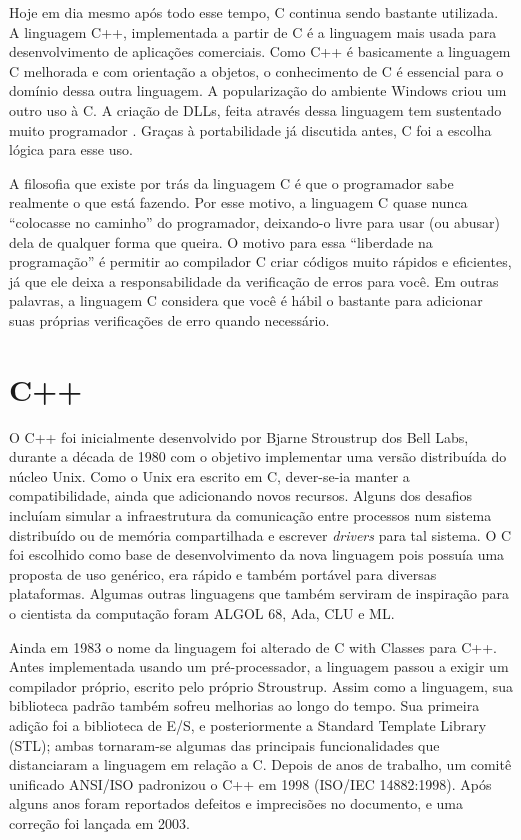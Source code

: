 \documentclass[
    12pt,               %
    openright,          %
    twoside,            %
    a4paper,            %
    brazil              %
    ]{abntex2}
\begin{document}
Hoje em dia mesmo após todo esse tempo, C continua sendo bastante utilizada. A
linguagem C++, implementada a partir de C é a linguagem mais usada para
desenvolvimento de aplicações comerciais.  Como C++ é basicamente a linguagem C
melhorada e com orientação a objetos, o conhecimento de C é essencial para o
domínio dessa outra linguagem. A popularização do ambiente Windows criou um
outro uso à C. A criação de DLLs, feita através dessa linguagem tem sustentado
muito programador . Graças à portabilidade já discutida antes, C foi a escolha
lógica para esse uso.

A filosofia que existe por trás da linguagem C é que o programador sabe
realmente o que está fazendo.  Por esse motivo, a linguagem C quase nunca
“colocasse no caminho” do programador, deixando-o livre para usar (ou abusar)
dela de qualquer forma que queira. O motivo para essa “liberdade na
programação” é permitir ao compilador C criar códigos muito rápidos e
eficientes, já que ele deixa a responsabilidade da verificação de erros para
você. Em outras palavras, a linguagem C considera que você é hábil o bastante
para adicionar suas próprias verificações de erro quando necessário. \cite{C} 

\clearpage
\section{C++}

O C++ foi inicialmente desenvolvido por Bjarne Stroustrup dos Bell Labs,
durante a década de 1980 com o objetivo implementar uma versão distribuída do
núcleo Unix. Como o Unix era escrito em C, dever-se-ia manter a
compatibilidade, ainda que adicionando novos recursos. Alguns dos desafios
incluíam simular a infraestrutura da comunicação entre processos num sistema
distribuído ou de memória compartilhada e escrever \textit{drivers} para tal
sistema. O C foi escolhido como base de desenvolvimento da nova linguagem pois
possuía uma proposta de uso genérico, era rápido e também portável para
diversas plataformas. Algumas outras linguagens que também serviram de
inspiração para o cientista da computação foram ALGOL 68, Ada, CLU e ML.

Ainda em 1983 o nome da linguagem foi alterado de C with Classes para C++.
Antes implementada usando um pré-processador, a linguagem passou a exigir um
compilador próprio, escrito pelo próprio Stroustrup. Assim como a linguagem,
sua biblioteca padrão também sofreu melhorias ao longo do tempo. Sua primeira
adição foi a biblioteca de E/S, e posteriormente a Standard Template Library
(STL); ambas tornaram-se algumas das principais funcionalidades que
distanciaram a linguagem em relação a C.  Depois de anos de trabalho, um comitê
unificado ANSI/ISO padronizou o C++ em 1998 (ISO/IEC 14882:1998). Após alguns
anos foram reportados defeitos e imprecisões no documento, e uma correção foi
lançada em 2003.\cite{IntroCPP}
\end{document}
